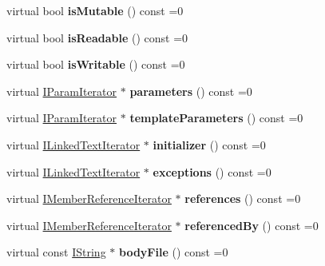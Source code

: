 \begin{DoxyCompactItemize}
virtual bool {\bfseries is\+Mutable} () const =0
\item 
\mbox{\label{class_i_member_a6bf26024d267ccded87fa9ff7864e971}} 
virtual bool {\bfseries is\+Readable} () const =0
\item 
\mbox{\label{class_i_member_ab8a6588e64ee9650291982660116ccfd}} 
virtual bool {\bfseries is\+Writable} () const =0
\item 
\mbox{\label{class_i_member_ae503c16b26b3237de63360334a3d3dc1}} 
virtual \mbox{\hyperlink{class_i_param_iterator}{I\+Param\+Iterator}} $\ast$ {\bfseries parameters} () const =0
\item 
\mbox{\label{class_i_member_a97b3e3e227f761e487cb88984c5ef138}} 
virtual \mbox{\hyperlink{class_i_param_iterator}{I\+Param\+Iterator}} $\ast$ {\bfseries template\+Parameters} () const =0
\item 
\mbox{\label{class_i_member_a0086bf38ebcd9b4ab38184848a962618}} 
virtual \mbox{\hyperlink{class_i_linked_text_iterator}{I\+Linked\+Text\+Iterator}} $\ast$ {\bfseries initializer} () const =0
\item 
\mbox{\label{class_i_member_a7ed235ada7fb119eeed374d2579ba8c8}} 
virtual \mbox{\hyperlink{class_i_linked_text_iterator}{I\+Linked\+Text\+Iterator}} $\ast$ {\bfseries exceptions} () const =0
\item 
\mbox{\label{class_i_member_afa780eb808fdf432cf520834da5301c1}} 
virtual \mbox{\hyperlink{class_i_member_reference_iterator}{I\+Member\+Reference\+Iterator}} $\ast$ {\bfseries references} () const =0
\item 
\mbox{\label{class_i_member_adb91bddf548f3ba728d20873ce50ec0b}} 
virtual \mbox{\hyperlink{class_i_member_reference_iterator}{I\+Member\+Reference\+Iterator}} $\ast$ {\bfseries referenced\+By} () const =0
\item 
\mbox{\label{class_i_member_ab1bb32a7d83ebb8b8150d0e638a646a1}} 
virtual const \mbox{\hyperlink{class_i_string}{I\+String}} $\ast$ {\bfseries body\+File} () const =0
\item 

\end{DoxyCompactItemize}
